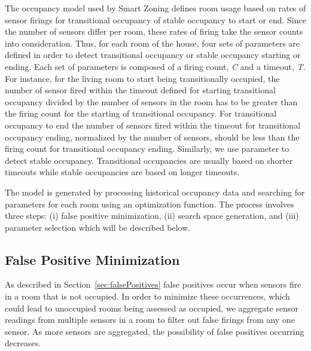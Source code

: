 
The occupancy model used by Smart Zoning defines room usage based on rates of
sensor firings for transitional occupancy of stable occupancy to start or
end. Since the number of sensors differ per room, these rates of firing take the
sensor counts into consideration. Thus, for each room of the house, four sets of
parameters are defined in order to detect transitional occupancy or stable
occupancy starting or ending. Each set of parameters is composed of a firing
count, {\em C} and a timeout, {\em T}. For instance, for the living room to
start being transitionally occupied, the number of sensor fired within the
timeout defined for starting transitional occupancy divided by the number of
sensors in the room has to be greater than the firing count for the starting of
transitional occupancy. For transitional occupancy to end the number of sensors
fired within the timeout for transitional occupancy ending, normalized by the
number of sensors, should be less than the firing count for transitional
occupancy ending. Similarly, we use parameter to detect stable
occupancy. Transitional occupancies are usually based on shorter timeouts while
stable occupancies are based on longer timeouts.


The model is generated by processing historical occupancy data and searching for
parameters for each room using an optimization function. The process involves
three steps: (i) false positive minimization, (ii) search space generation, and
(iii) parameter selection which will be described below.

\subsection{False Positive Minimization}
As described in Section~\ref{sec:falsePositives} false positives occur when
sensors fire in a room that is not occupied. In order to minimize these
occurrences, which could lead to unoccupied rooms being assessed as occupied, we
aggregate sensor readings from multiple sensors in a room to filter out false
firings from any one sensor. As more sensors are aggregated, the possibility of
false positives occurring decreases. 

